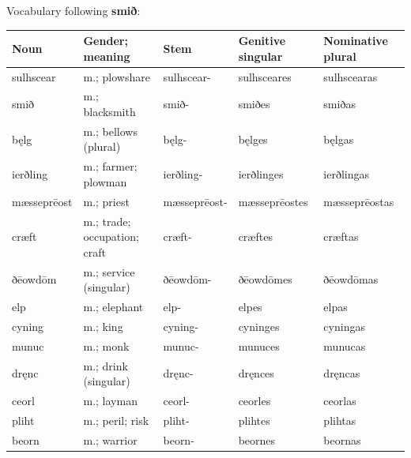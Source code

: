 Vocabulary following \textbf{smið}:

\par\begingroup
\fontsize{10.5}{13.2}\selectfont
\setlength{\LTleft}{0pt}\setlength{\LTright}{\fill}
\noindent
\begin{tabular}{@{}>{\raggedright\arraybackslash}p{21.3mm}>{\raggedright\arraybackslash}p{20mm}>{\raggedright\arraybackslash}p{22.3mm}>{\raggedright\arraybackslash}p{24.6mm}>{\raggedright\arraybackslash}p{24.55mm}@{}}
\toprule
\textbf{Noun} & \textbf{Gender; meaning} & \textbf{Stem} & \textbf{Genitive singular} & \textbf{Nominative plural} \\
\midrule
sulhscear & m.; plowshare & sulhscear- & sulhsceares & sulhscearas \\
smið & m.; blacksmith & smið- & smiðes & smiðas \\
bęlg & m.; bellows (plural) & bęlg- & bęlges & bęlgas \\
ierðling & m.; farmer; plowman & ierðling- & ierðlinges & ierðlingas \\
mæsseprēost & m.; priest & mæsseprēost- & mæsseprēostes & mæsseprēostas \\
cræft & m.; trade; occupation; craft & cræft- & cræftes & cræftas \\
ðēowdōm & m.; service (singular) & ðēowdōm- & ðēowdōmes & ðēowdōmas \\
elp & m.; elephant & elp- & elpes & elpas \\
cyning & m.; king & cyning- & cyninges & cyningas \\
munuc & m.; monk & munuc- & munuces & munucas \\
dręnc & m.; drink (singular) & dręnc- & dręnces & dręncas \\
ceorl & m.; layman & ceorl- & ceorles & ceorlas \\
pliht & m.; peril; risk & pliht- & plihtes & plihtas \\
beorn & m.; warrior & beorn- & beornes & beornas \\
\bottomrule
\end{tabular}
\par\endgroup

